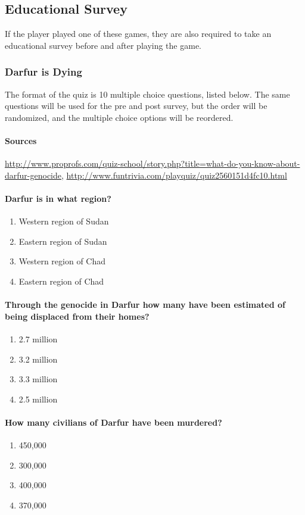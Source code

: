 \subsection{Educational Survey}
	If the player played one of these games, they are also required to take an educational survey before and after playing the game.
	\subsubsection{Darfur is Dying}
		The format of the quiz is 10 multiple choice questions, listed below. The same questions will be used for the pre and post survey, but the order will be randomized, and the multiple choice options will be reordered.
		\paragraph{Sources} \url{http://www.proprofs.com/quiz-school/story.php?title=what-do-you-know-about-darfur-genocide}, \url{http://www.funtrivia.com/playquiz/quiz2560151d4fc10.html}

		\paragraph{Darfur is in what region?}
			\begin{enumerate}
				\item Western region of Sudan
				\item Eastern region of Sudan
				\item Western region of Chad
				\item Eastern region of Chad
			\end{enumerate}

		\paragraph{Through the genocide in Darfur how many have been estimated of being displaced from their homes?}
			\begin{enumerate}
				\item 2.7 million
				\item 3.2 million
				\item 3.3 million
				\item 2.5 million
			\end{enumerate}

		\paragraph{How many civilians of Darfur have been murdered?}
			\begin{enumerate}
				\item 450,000
				\item 300,000
				\item 400,000
				\item 370,000
			\end{enumerate}

